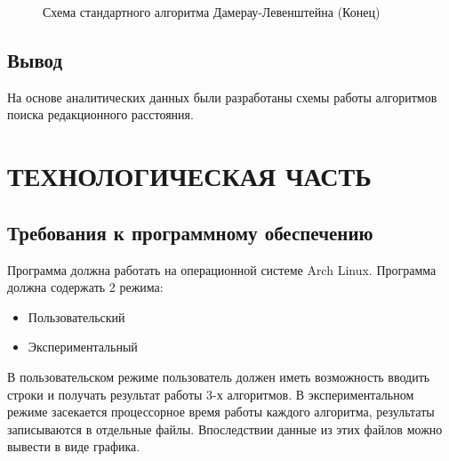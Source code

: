 \documentclass[a4paper,12pt]{article}
\begin{document}
\begin{figure}[p]
\caption{Схема стандартного алгоритма Дамерау-Левенштейна (Конец)}
\label{images:damerau_levenstein2}
\end{figure}

\newpage
\subsection{Вывод}
На основе аналитических данных были разработаны схемы работы алгоритмов поиска редакционного расстояния.


\newpage
\section{ТЕХНОЛОГИЧЕСКАЯ ЧАСТЬ}
\subsection{Требования к программному обеспечению}
Программа должна работать на операционной системе Arch Linux. Программа должна
содержать 2 режима:
\begin{itemize}
\item Пользовательский
\item Экспериментальный
\end{itemize}
В пользовательском режиме пользователь должен иметь возможность вводить строки и получать результат работы 3-х алгоритмов. В экспериментальном режиме засекается процессорное время работы каждого алгоритма, результаты записываются в отдельные файлы. Впоследствии данные из этих файлов можно вывести в виде графика.
\end{document}
